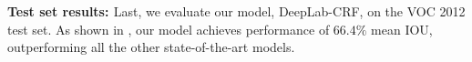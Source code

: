 {\bf{Test set results: }} Last, we evaluate our model, DeepLab-CRF, on the VOC 2012 test set. As shown in , our model achieves performance of $66.4\%$ mean IOU, outperforming all the other state-of-the-art models. 


